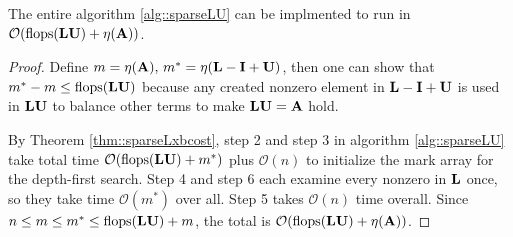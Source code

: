 \begin{thm}
    The entire algorithm \ref{alg::sparseLU} can be implmented 
    to run in $\mathcal{O}(\mathrm{flops}({\mathbf{L}}{\mathbf{U}})+\eta({\mathbf{A}}))$.
\end{thm}
\begin{proof}
    Define $m=\eta({\mathbf{A}}),\,m^*=\eta({\mathbf{L}}-{\mathbf{I}}+{\mathbf{U}})$, then one can 
    show that $m^*-m\leq \mathrm{flops}({\mathbf{L}}{\mathbf{U}})$ because any 
    created nonzero element in ${\mathbf{L}}-{\mathbf{I}}+{\mathbf{U}}$ is used in 
    ${\mathbf{L}}{\mathbf{U}}$ to balance other terms to make ${\mathbf{L}}{\mathbf{U}}={\mathbf{A}}$ hold. 
    
    By Theorem \ref{thm::sparseLxbcost}, step 2 and step 3 in 
    algorithm \ref{alg::sparseLU} take total time $\mathcal{O}
    (\mathrm{flops}({\mathbf{L}}{\mathbf{U}})+m^*)$ plus $\mathcal{O}(n)$ to 
    initialize the mark array for the depth-first search. Step 
    4 and step 6 each examine every nonzero in ${\mathbf{L}}$ once, so 
    they take time $\mathcal{O}(m^*)$ over all. Step 5 takes 
    $\mathcal{O}(n)$ time overall. Since $n\leq m\leq m^*\leq 
    \mathrm{flops}({\mathbf{L}}{\mathbf{U}})+m$, the total is $\mathcal{O}
    (\mathrm{flops}({\mathbf{L}}{\mathbf{U}})+\eta({\mathbf{A}}))$.
\end{proof}